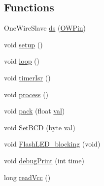\subsection*{Functions}
\begin{DoxyCompactItemize}
\item 
One\-Wire\-Slave \hyperlink{OWGeneric__DangerShield_8ino_a29dc68449cb5938be210109740e26ce3}{ds} (\hyperlink{OWRain1_8ino_a7f5aa1ac0711ae18877a165a9bf24625}{O\-W\-Pin})
\item 
void \hyperlink{OWGeneric__DangerShield_8ino_a4fc01d736fe50cf5b977f755b675f11d}{setup} ()
\item 
void \hyperlink{OWGeneric__DangerShield_8ino_afe461d27b9c48d5921c00d521181f12f}{loop} ()
\item 
void \hyperlink{OWGeneric__DangerShield_8ino_ad97e1651258f04ff0c1f74136910ce2d}{timer\-Isr} ()
\item 
void \hyperlink{OWGeneric__DangerShield_8ino_a2e9c5136d19b1a95fc427e0852deab5c}{process} ()
\item 
void \hyperlink{OWGeneric__DangerShield_8ino_a097292225769f56d224f441fee48cbdb}{pack} (float \hyperlink{Uno__Read__CurrentTransformer__SCT__013__030_8ino_aa0ccb5ee6d882ee3605ff47745c6467b}{val})
\item 
void \hyperlink{OWGeneric__DangerShield_8ino_a4a08de21b6e4d4a4613bd3a331c45309}{Set\-B\-C\-D} (byte \hyperlink{Uno__Read__CurrentTransformer__SCT__013__030_8ino_aa0ccb5ee6d882ee3605ff47745c6467b}{val})
\item 
void \hyperlink{OWGeneric__DangerShield_8ino_a4833df7e1a798440cec59dfdf6d1eaf9}{Flash\-L\-E\-D\-\_\-blocking} (void)
\item 
void \hyperlink{OWGeneric__DangerShield_8ino_aea2efd3e27dd82d17fd923d99287f981}{debug\-Print} (int time)
\item 
long \hyperlink{OWGeneric__DangerShield_8ino_a8e23c9421f6663303ea22e4969e2f6c1}{read\-Vcc} ()
\end{DoxyCompactItemize}

